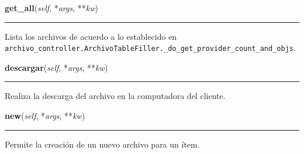     \vspace{0.5ex}

\hspace{.8\funcindent}\begin{boxedminipage}{\funcwidth}

    \raggedright \textbf{get\_all}(\textit{self}, *\textit{args}, **\textit{kw})

    \vspace{-1.5ex}

    \rule{\textwidth}{0.5\fboxrule}
\setlength{\parskip}{2ex}
    Lista los archivos de acuerdo a lo establecido en 
    \texttt{archivo\_controller.ArchivoTableFiller.\_do\_get\_provider\_count\_and\_objs}.

\setlength{\parskip}{1ex}
    \end{boxedminipage}

    \label{saip:controllers:archivo_controller:ArchivoController:descargar}

    \vspace{0.5ex}

\hspace{.8\funcindent}\begin{boxedminipage}{\funcwidth}

    \raggedright \textbf{descargar}(\textit{self}, *\textit{args}, **\textit{kw})

    \vspace{-1.5ex}

    \rule{\textwidth}{0.5\fboxrule}
\setlength{\parskip}{2ex}
    Realiza la descarga del archivo en la computadora del cliente.

\setlength{\parskip}{1ex}
    \end{boxedminipage}

    \label{saip:controllers:archivo_controller:ArchivoController:new}

    \vspace{0.5ex}

\hspace{.8\funcindent}\begin{boxedminipage}{\funcwidth}

    \raggedright \textbf{new}(\textit{self}, *\textit{args}, **\textit{kw})

    \vspace{-1.5ex}

    \rule{\textwidth}{0.5\fboxrule}
\setlength{\parskip}{2ex}
    Permite la creación de un nuevo archivo para un ítem.

\setlength{\parskip}{1ex}
    \end{boxedminipage}

